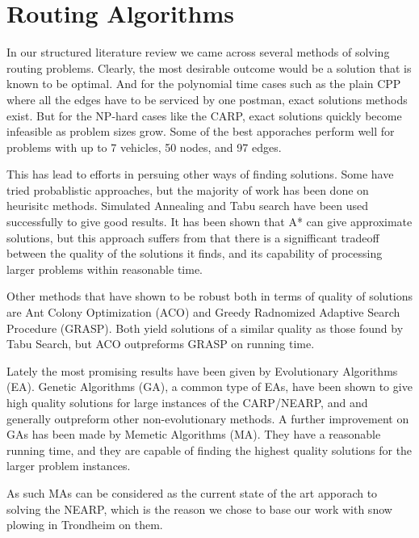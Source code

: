 

\section{Routing Algorithms} %
\label{sec:routing_algorithms}

In our structured literature review we came across several methods of solving routing problems. Clearly, the most desirable outcome would be a solution that is known to be optimal. And for the polynomial time cases such as the plain CPP where all the edges have to be serviced by one postman, exact solutions methods exist. But for the NP-hard cases like the CARP, exact solutions quickly become infeasible as problem sizes grow. Some of the best apporaches perform well for problems with up to 7 vehicles, 50 nodes, and 97 edges.

This has lead to efforts in persuing other ways of finding solutions. Some have tried probablistic approaches, but the majority of work has been done on heurisitc methods. Simulated Annealing and Tabu search have been used successfully to give good results. It has been shown that A* can give approximate solutions, but this approach suffers from that there is a signifficant tradeoff between the quality of the solutions it finds, and its capability of processing larger problems within reasonable time.

Other methods that have shown to be robust both in terms of quality of solutions are Ant Colony Optimization (ACO) and Greedy Radnomized Adaptive Search Procedure (GRASP). Both yield solutions of a similar quality as those found by Tabu Search, but ACO outpreforms GRASP on running time.

Lately the most promising results have been given by Evolutionary Algorithms (EA). Genetic Algorithms (GA), a common type of EAs, have been shown to give high quality solutions for large instances of the CARP/NEARP, and and generally outpreform other non-evolutionary methods. A further improvement on GAs has been made by Memetic Algorithms (MA). They have a reasonable running time, and they are capable of finding the highest quality solutions for the larger problem instances.

As such MAs can be considered as the current state of the art apporach to solving the NEARP, which is the reason we chose to base our work with snow plowing in Trondheim on them.

